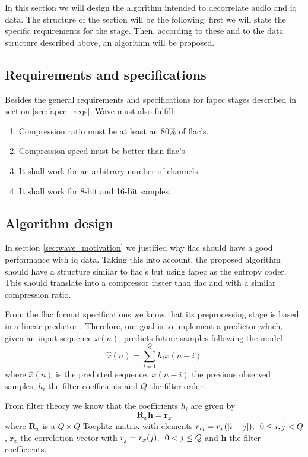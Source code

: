 In this section we will design the algorithm intended to decorrelate audio and \acrshort{iq} data. The structure of the section will be the following: first we will state the specific requirements for the stage. Then, according to these and to the data structure described above, an algorithm will be proposed.

\subsection{Requirements and specifications}
Besides the general requirements and specifications for \acrshort{fapec} stages described in section \ref{sec:fapec_reqs}, Wave must also fulfill:
\begin{enumerate}
	\item Compression ratio must be at least an 80\% of \acrshort{flac}'s.
	\item Compression speed must be better than \acrshort{flac}'s.
	\item It shall work for an arbitrary number of channels.
	\item It shall work for 8-bit and 16-bit samples.
\end{enumerate}

\subsection{Algorithm design}
In section \ref{sec:wave_motivation} we justified why \acrshort{flac} should have a good performance with \acrshort{iq} data. Taking this into account, the proposed algorithm should have a structure similar to \acrshort{flac}'s but using \acrshort{fapec} as the entropy coder. This should translate into a compressor faster than \acrshort{flac} and with a similar compression ratio.

From the \acrshort{flac} format specifications we know that its preprocessing stage is based in a linear predictor \parencite{FLAC}. Therefore, our goal is to implement a predictor which, given an input sequence $x(n)$, predicts future samples following the model
\begin{equation}
\hat{x}(n) = \sum_{i=1}^{Q} h_i x(n-i)
\end{equation}
where $\hat{x}(n)$ is the predicted sequence, $x(n-i)$ the previous observed samples, $h_i$ the filter coefficients and $Q$ the filter order.

From filter theory \parencite{PSAVC} we know that the coefficients $h_i$ are given by
\begin{equation} \label{eq_normal_eqs_matrix}
\mathbf{R}_x \mathbf{h} = \mathbf{r}_x
\end{equation}
where $\mathbf{R}_x$ is a $Q \times Q$ Toeplitz matrix with elements $r_{ij} = r_x(|i-j|),\hspace{0.5em} 0 \leq i,j < Q$, $\mathbf{r}_x$ the correlation vector with $r_j = r_x(j),\hspace{0.5em} 0 < j \leq Q$ and $\mathbf{h}$ the filter coefficients.

